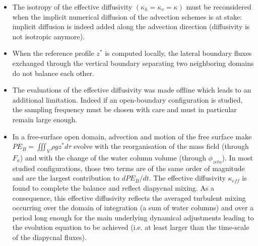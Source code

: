 \begin{itemize}
\item The isotropy of the effective diffusivity $(\kappa_h=\kappa_v=\kappa)$ must be reconsidered when the implicit numerical diffusion of the advection schemes is at stake: implicit diffusion is indeed added along the advection direction (diffusivity is not isotropic anymore).
\item When the reference profile $z^*$ is computed locally, the lateral boundary fluxes exchanged through the vertical boundary separating two neighboring domains do not balance each other.
\item The evaluations of the effective diffusivity was made offline which leads to an additional limitation. Indeed if an open-boundary configuration is studied, the sampling frequency must be chosen with care and must in particular remain large enough.
\item In a free-surface open domain, advection and motion of the free surface make $PE_B=\iiint_V \rho g z^* d\tau$ evolve with the reorganisation of the mass field (through $F_a$) and with the change of the water column volume (through $\phi_{zeta}$). In most studied configurations, those two terms are of the same order of magnitude and are the largest contribution to $dPE_B/dt$. The effective diffusivity $\kappa_{eff}$ is found to complete the balance and reflect diapycnal mixing. As a consequence, this effective diffusivity reflects the averaged turbulent mixing occurring over the domain of integration (a sum of water columns) and over a period long enough for the main underlying dynamical adjustments leading to the evolution equation to be achieved (i.e. at least larger than the time-scale of the diapycnal fluxes).

\end{itemize}

